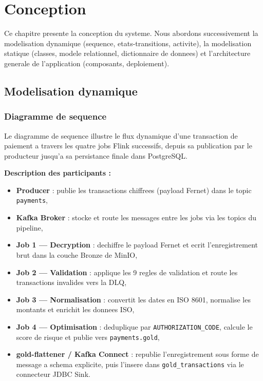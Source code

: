 \chapter{Conception}
\label{chap:conception}

\introchapitre

Ce chapitre presente la conception du systeme. Nous abordons successivement la
modelisation dynamique (sequence, etats-transitions, activite), la modelisation
statique (classes, modele relationnel, dictionnaire de donnees) et l'architecture
generale de l'application (composants, deploiement).

\section{Modelisation dynamique}
\label{sec:dynamique}

\subsection{Diagramme de sequence}

Le diagramme de sequence illustre le flux dynamique d'une transaction de paiement a
travers les quatre jobs Flink successifs, depuis sa publication par le producteur
jusqu'a sa persistance finale dans PostgreSQL.

\textbf{Description des participants :}
\begin{itemize}
    \item \textbf{Producer} : publie les transactions chiffrees (payload Fernet) dans
    le topic \texttt{payments},
    \item \textbf{Kafka Broker} : stocke et route les messages entre les jobs via les
    topics du pipeline,
    \item \textbf{Job 1 --- Decryption} : dechiffre le payload Fernet et ecrit
    l'enregistrement brut dans la couche Bronze de MinIO,
    \item \textbf{Job 2 --- Validation} : applique les 9 regles de validation et route
    les transactions invalides vers la DLQ,
    \item \textbf{Job 3 --- Normalisation} : convertit les dates en ISO 8601, normalise
    les montants et enrichit les donnees ISO,
    \item \textbf{Job 4 --- Optimisation} : deduplique par \texttt{AUTHORIZATION\_CODE},
    calcule le score de risque et publie vers \texttt{payments.gold},
    \item \textbf{gold-flattener / Kafka Connect} : republie l'enregistrement sous
    forme de message a schema explicite, puis l'insere dans \texttt{gold\_transactions}
    via le connecteur JDBC Sink.
\end{itemize}

